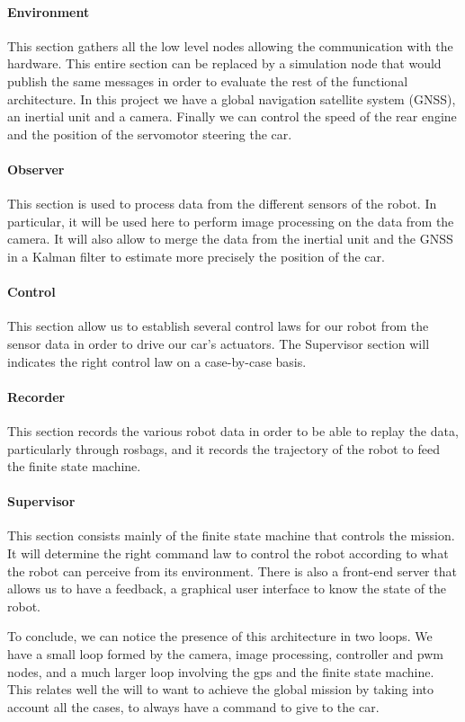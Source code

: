 \paragraph{Environment} This section gathers all the low level nodes allowing the 
communication with the hardware. This entire section can be replaced by a simulation
node that would publish the same messages in order to evaluate the rest of the 
functional architecture. In this project we have a global navigation satellite system
(GNSS), an inertial unit and a camera. Finally we can control the speed of the rear
engine and the position of the servomotor steering the car.

\paragraph{Observer} This section is used to process data from the different sensors of
the robot. In particular, it will be used here to perform image processing on the data
from the camera. It will also allow to merge the data from the inertial unit and the GNSS
in a Kalman filter to estimate more precisely the position of the car.

\paragraph{Control} This section allow us to establish several control laws for our robot
from the sensor data in order to drive our car's actuators. The Supervisor section will
indicates the right control law on a case-by-case basis.

\paragraph{Recorder} This section records the various robot data in order to be able to 
replay the data, particularly through rosbags, and it records the trajectory of the robot
to feed the finite state machine.

\paragraph{Supervisor} This section consists mainly of the finite state machine that controls
the mission. It will determine the right command law to control the robot according to what the
robot can perceive from its environment. There is also a front-end server that allows us to have
a feedback, a graphical user interface to know the state of the robot.

To conclude, we can notice the presence of this architecture in two loops. We have a small loop formed
by the camera, image processing, controller and pwm nodes, and a much larger loop involving
the gps and the finite state machine. This relates well the will to want to achieve the
global mission by taking into account all the cases, to always have a command to give to
the car.

\newpage